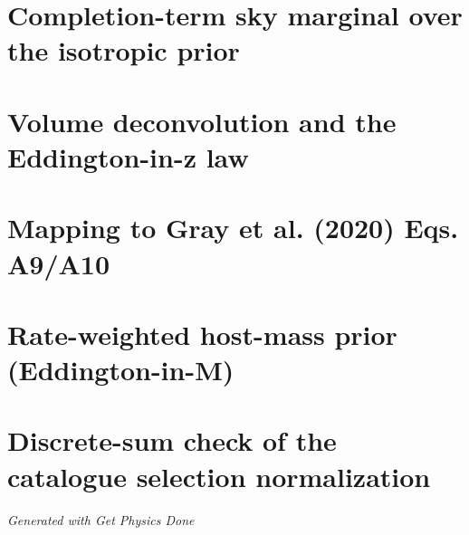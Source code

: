 \documentclass[usenatbib]{mnras}
\begin{document}
\appendix
\section{Completion-term sky marginal over the isotropic prior}
\label{sec:app:sky}
\section{Volume deconvolution and the Eddington-in-z law}
\label{sec:app:voldeconv}
\section{Mapping to Gray et al. (2020) Eqs. A9/A10}
\label{sec:app:gray}
\section{Rate-weighted host-mass prior (Eddington-in-M)}
\label{sec:app:eddm}
\section{Discrete-sum check of the catalogue selection normalization}
\label{sec:app:betag}




\begin{center}
{\footnotesize\textit{Generated with Get Physics Done}}
\end{center}
\end{document}
